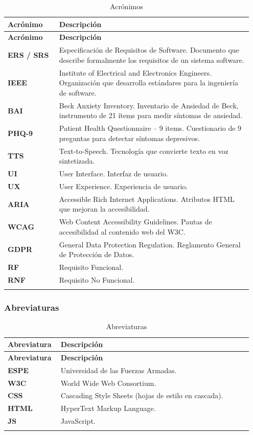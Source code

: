\begin{longtable}{p{0.20\linewidth} p{0.75\linewidth}}
\toprule
\rowcolor{tableheader!20}
\textbf{Acrónimo} & \textbf{Descripción} \\
\midrule
\endfirsthead
\rowcolor{tableheader!20}
\textbf{Acrónimo} & \textbf{Descripción} \\
\midrule
\endhead
\bottomrule
\endfoot
\textbf{ERS / SRS} & Especificación de Requisitos de Software. Documento que describe formalmente los requisitos de un sistema software. \\
\textbf{IEEE} & Institute of Electrical and Electronics Engineers. Organización que desarrolla estándares para la ingeniería de software. \\
\textbf{BAI} & Beck Anxiety Inventory. Inventario de Ansiedad de Beck, instrumento de 21 ítems para medir síntomas de ansiedad. \\
\textbf{PHQ-9} & Patient Health Questionnaire -- 9 items. Cuestionario de 9 preguntas para detectar síntomas depresivos. \\
\textbf{TTS} & Text-to-Speech. Tecnología que convierte texto en voz sintetizada. \\
\textbf{UI} & User Interface. Interfaz de usuario. \\
\textbf{UX} & User Experience. Experiencia de usuario. \\
\textbf{ARIA} & Accessible Rich Internet Applications. Atributos HTML que mejoran la accesibilidad. \\
\textbf{WCAG} & Web Content Accessibility Guidelines. Pautas de accesibilidad al contenido web del W3C. \\
\textbf{GDPR} & General Data Protection Regulation. Reglamento General de Protección de Datos. \\
\textbf{RF} & Requisito Funcional. \\
\textbf{RNF} & Requisito No Funcional. \\
\bottomrule
\caption{Acrónimos}
\label{tab:acronimos}
\end{longtable}

\subsubsection{Abreviaturas}

\begin{longtable}{p{0.20\linewidth} p{0.75\linewidth}}
\toprule
\rowcolor{tableheader!20}
\textbf{Abreviatura} & \textbf{Descripción} \\
\midrule
\endfirsthead
\rowcolor{tableheader!20}
\textbf{Abreviatura} & \textbf{Descripción} \\
\midrule
\endhead
\bottomrule
\endfoot
\textbf{ESPE} & Universidad de las Fuerzas Armadas. \\
\textbf{W3C} & World Wide Web Consortium. \\
\textbf{CSS} & Cascading Style Sheets (hojas de estilo en cascada). \\
\textbf{HTML} & HyperText Markup Language. \\
\textbf{JS} & JavaScript. \\
\bottomrule
\caption{Abreviaturas}
\label{tab:abreviaturas}
\end{longtable}

